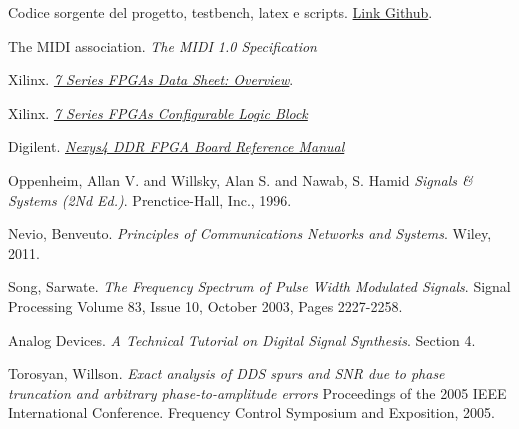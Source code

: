

\begin{thebibliography}{9}
Codice sorgente del progetto, testbench, latex e scripts.
\href{http://github.com/doppioandante/tesi}{Link Github}.

The MIDI association.
\textit{The MIDI 1.0 Specification}

Xilinx.
\href{https://www.xilinx.com/support/documentation/data_sheets/ds180_7Series_Overview.pdf}{\textit{7 Series FPGAs Data Sheet: Overview}}.

Xilinx.
\href{https://www.xilinx.com/support/documentation/user_guides/ug474_7Series_CLB.pdf}{\textit{7 Series FPGAs Configurable Logic Block}}

Digilent.
\href{https://www.xilinx.com/support/documentation/university/XUP%20Boards/XUPNexys4DDR/documentation/Nexys4-DDR_rm.pdf}{\textit{Nexys4 DDR FPGA Board Reference Manual}}

Oppenheim, Allan V. and Willsky, Alan S. and Nawab, S. Hamid
\textit{Signals \& Systems (2Nd Ed.)}.
Prenctice-Hall, Inc., 1996.

Nevio, Benveuto.
\textit{Principles of Communications Networks and Systems}.
Wiley, 2011.

Song, Sarwate.
\textit{The Frequency Spectrum of Pulse Width Modulated Signals}.
Signal Processing Volume 83, Issue 10, October 2003, Pages 2227-2258.

Analog Devices.
\textit{A Technical Tutorial on Digital Signal Synthesis}.
Section 4.

Torosyan, Willson.
\textit{Exact analysis of DDS spurs and SNR due to phase truncation and arbitrary phase-to-amplitude errors}
Proceedings of the 2005 IEEE International Conference.
Frequency Control Symposium and Exposition, 2005. 
\end{thebibliography}
